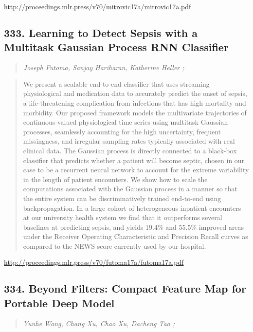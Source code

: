\documentclass{article}
\begin{document}
\href{http://proceedings.mlr.press/v70/mitrovic17a/mitrovic17a.pdf}{http://proceedings.mlr.press/v70/mitrovic17a/mitrovic17a.pdf}

\subsection{333. Learning to Detect Sepsis with a Multitask Gaussian Process RNN Classifier}

\begin{quote}
\footnotesize{\textit{Joseph Futoma, Sanjay Hariharan, Katherine Heller ;}}
\end{quote}

\begin{quote}
    We present a scalable end-to-end classifier that uses streaming physiological and medication data to accurately predict the onset of sepsis, a life-threatening complication from infections that has high mortality and morbidity. Our proposed framework models the multivariate trajectories of continuous-valued physiological time series using multitask Gaussian processes, seamlessly accounting for the high uncertainty, frequent missingness, and irregular sampling rates typically associated with real clinical data. The Gaussian process is directly connected to a black-box classifier that predicts whether a patient will become septic, chosen in our case to be a recurrent neural network to account for the extreme variability in the length of patient encounters. We show how to scale the computations associated with the Gaussian process in a manner so that the entire system can be discriminatively trained end-to-end using backpropagation. In a large cohort of heterogeneous inpatient encounters at our university health system we find that it outperforms several baselines at predicting sepsis, and yields 19.4\% and 55.5\% improved areas under the Receiver Operating Characteristic and Precision Recall curves as compared to the NEWS score currently used by our hospital.  \end{quote}

\href{http://proceedings.mlr.press/v70/futoma17a/futoma17a.pdf}{http://proceedings.mlr.press/v70/futoma17a/futoma17a.pdf}

\subsection{334. Beyond Filters: Compact Feature Map for Portable Deep Model}

\begin{quote}
\footnotesize{\textit{Yunhe Wang, Chang Xu, Chao Xu, Dacheng Tao ;}}
\end{quote}
\end{document}
